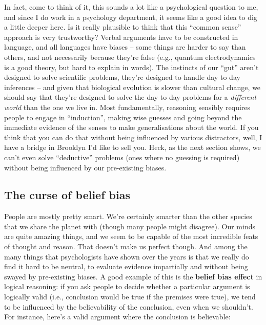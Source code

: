 \documentclass[
]{book}
\begin{document}
In fact, come to think of it, this sounds a lot like a psychological question to me, and since I do work in a psychology department, it seems like a good idea to dig a little deeper here. Is it really plausible to think that this ``common sense'' approach is very trustworthy? Verbal arguments have to be constructed in language, and all languages have biases -- some things are harder to say than others, and not necessarily because they're false (e.g., quantum electrodynamics is a good theory, but hard to explain in words). The instincts of our ``gut'' aren't designed to solve scientific problems, they're designed to handle day to day inferences -- and given that biological evolution is slower than cultural change, we should say that they're designed to solve the day to day problems for a \emph{different world} than the one we live in. Most fundamentally, reasoning sensibly requires people to engage in ``induction'', making wise guesses and going beyond the immediate evidence of the senses to make generalisations about the world. If you think that you can do that without being influenced by various distractors, well, I have a bridge in Brooklyn I'd like to sell you. Heck, as the next section shows, we can't even solve ``deductive'' problems (ones where no guessing is required) without being influenced by our pre-existing biases.

\hypertarget{the-curse-of-belief-bias}{%
\subsection{The curse of belief bias}\label{the-curse-of-belief-bias}}

People are mostly pretty smart. We're certainly smarter than the other species that we share the planet with (though many people might disagree). Our minds are quite amazing things, and we seem to be capable of the most incredible feats of thought and reason. That doesn't make us perfect though. And among the many things that psychologists have shown over the years is that we really do find it hard to be neutral, to evaluate evidence impartially and without being swayed by pre-existing biases. A good example of this is the \textbf{belief bias effect} in logical reasoning: if you ask people to decide whether a particular argument is logically valid (i.e., conclusion would be true if the premises were true), we tend to be influenced by the believability of the conclusion, even when we shouldn't. For instance, here's a valid argument where the conclusion is believable:
\end{document}
